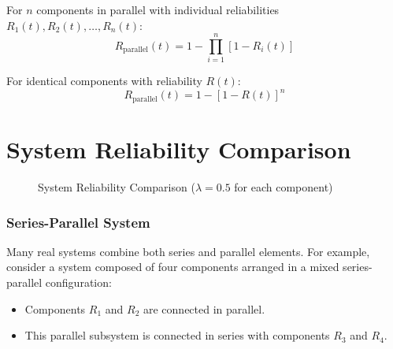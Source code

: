 \documentclass[twoside]{book}
\begin{document}
For $n$ components in parallel with individual reliabilities $R_1(t), R_2(t), \ldots, R_n(t)$:
\begin{equation*}
R_{\text{parallel}}(t) = 1 - \prod_{i=1}^n [1 - R_i(t)]
\end{equation*}

For identical components with reliability $R(t)$:
\begin{equation*}
R_{\text{parallel}}(t) = 1 - [1 - R(t)]^n
\end{equation*}


\section{System Reliability Comparison}

\begin{figure}[H]
\centering
{}
\caption{System Reliability Comparison ($\lambda = 0.5$ for each component)}
\end{figure}

\subsubsection{Series-Parallel System}

Many real systems combine both series and parallel elements. For example, consider a system composed of four components arranged in a mixed series-parallel configuration:
\begin{itemize}
    \item Components $R_1$ and $R_2$ are connected in parallel.
    \item This parallel subsystem is connected in series with components $R_3$ and $R_4$.
\end{itemize}
\end{document}

